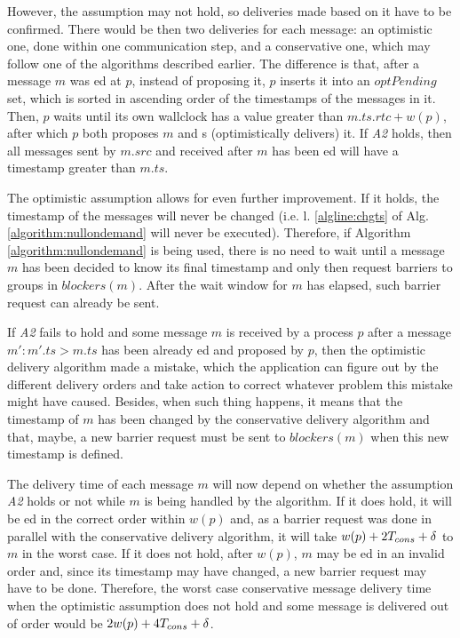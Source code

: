 \documentclass[times, 10pt]{article}
\begin{document}
However, the assumption may not hold, so deliveries made based on it have to be confirmed. There would be then two deliveries for each message: an optimistic one, done within one communication step, and a conservative one, which may follow one of the algorithms described earlier. The difference is that, after a message $m$ was \rmdel{}ed at $p$, instead of proposing it, $p$ inserts it into an $optPending$ set, which is sorted in ascending order of the timestamps of the messages in it. Then, $p$ waits until its own wallclock has a value greater than $m.ts.rtc + w(p)$, after which $p$ both proposes $m$ and \opt{}s (optimistically delivers) it. If \emph{A2} holds, then all messages sent by $m.src$ and received after $m$ has been \opt{}ed will have a timestamp greater than $m.ts$.

The optimistic assumption allows for even further improvement. If it holds, the timestamp of the messages will never be changed (i.e. l. \ref{algline:chgts} of Alg. \ref{algorithm:nullondemand} will never be executed). Therefore, if Algorithm \ref{algorithm:nullondemand} is being used, there is no need to wait until a message $m$ has been decided to know its final timestamp and only then request barriers to groups in $blockers(m)$. After the wait window for $m$ has elapsed, such barrier request can already be sent.

If \emph{A2} fails to hold and some message $m$ is received by a process $p$ after a message \mbox{$m' : m'.ts > m.ts$} has been already \opt{}ed and proposed by $p$, then the optimistic delivery algorithm made a mistake, which the application can figure out by the different delivery orders and take action to correct whatever problem this mistake might have caused. Besides, when such thing happens, it means that the timestamp of $m$ has been changed by the conservative delivery algorithm and that, maybe, a new barrier request must be sent to $blockers(m)$ when this new timestamp is defined.

The delivery time of each message $m$ will now depend on whether the assumption \emph{A2} holds or not while $m$ is being handled by the algorithm. If it does hold, it will be \opt{}ed in the correct order within $w(p)$ and, as a barrier request was done in parallel with the conservative delivery algorithm, it will take $w(p) + 2T_{cons} + \delta$ to \cons{} $m$ in the worst case. If it does not hold, after $w(p)$, $m$ may be \opt{}ed in an invalid order and, since its timestamp may have changed, a new barrier request may have to be done. Therefore, the worst case conservative message delivery time when the optimistic assumption does not hold and some message is delivered out of order would be $2w(p) + 4T_{cons} + \delta$.
\end{document}
